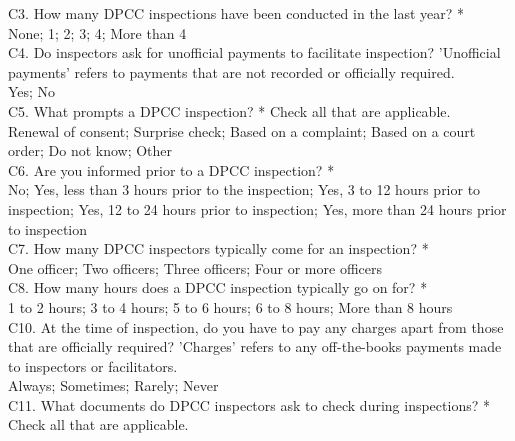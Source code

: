 \documentclass[a4paper, 12pt]{article}
\begin{document}
\begin{mdframed}[backgroundcolor=gray!20]
\begin{spacing}{0.5}
		
		{C3. How many DPCC inspections have been conducted in the last year? *} \\
		
		None; 1; 2; 3; 4; More than 4 \\
		
		{C4. Do inspectors ask for unofficial payments to facilitate inspection?} 'Unofficial payments' refers to payments that are not recorded or officially required. \\
		
		Yes; No \\
		
		{C5. What prompts a DPCC inspection? *} Check all that are applicable. \\
		
		Renewal of consent; Surprise check; Based on a complaint; Based on a court order; Do not know; Other \\
		
		{C6. Are you informed prior to a DPCC inspection? *} \\
		
		No; Yes, less than 3 hours prior to the inspection; Yes, 3 to 12 hours prior to inspection; Yes, 12 to 24 hours prior to inspection; Yes, more than 24 hours prior to inspection \\
		
		{C7. How many DPCC inspectors typically come for an inspection? *}  \\
		
		One officer; Two officers; Three officers; Four or more officers \\
		
		{C8. How many hours does a DPCC inspection typically go on for? *} \\
		
		1 to 2 hours; 3 to 4 hours; 5 to 6 hours; 6 to 8 hours; More than 8 hours \\
		
		{C10. At the time of inspection, do you have to pay any charges apart from those that are officially required?} 'Charges' refers to any off-the-books payments made to inspectors or facilitators. \\
		
		Always; Sometimes; Rarely; Never \\
		
		{C11. What documents do DPCC inspectors ask to check during inspections? *} Check all that are applicable. \\
		

\end{spacing}
\end{mdframed}
\end{document}
